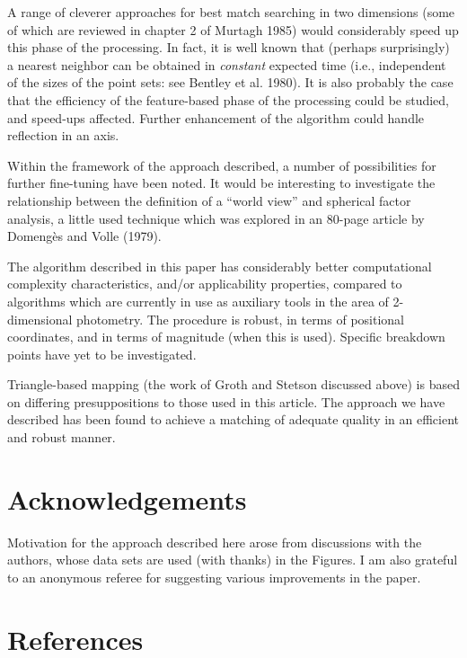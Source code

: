 A range of cleverer approaches for
best match searching in two dimensions (some of which are reviewed in chapter
2 of Murtagh 1985) would considerably speed up this phase of the processing.
In fact, it is well known that (perhaps surprisingly) a nearest neighbor 
can be obtained in {\it constant} expected time (i.e., independent of the
sizes of the point sets: see Bentley et al. 1980).
It is also probably the case that the efficiency of the 
feature-based phase of the
processing could be studied, and speed-ups affected.
 Further enhancement of the algorithm could handle 
reflection in an axis.

Within the framework of the approach described, a number of  
possibilities for further fine-tuning have been noted.  It would be
interesting to investigate the relationship between the definition
of a ``world view'' and 
spherical factor analysis, a little used technique which was
explored in an 80-page article by Domeng\`es and Volle (1979).  

The algorithm described in this paper has considerably better 
computational complexity 
characteristics, and/or applicability properties,
compared to algorithms which are currently in use as auxiliary tools in the
area of 2-dimensional photometry.   The procedure is robust, in terms of
positional coordinates, and in terms of magnitude (when this is used).  
Specific breakdown points have yet to be investigated.

Triangle-based mapping (the
work of Groth and Stetson discussed above) is based
on differing presuppositions to those used in this article.  The approach
we have described has been found to achieve a matching of adequate quality
in an efficient and robust manner.

\section*{Acknowledgements}

Motivation for the approach described here arose from discussions with the
authors, whose data sets are used (with thanks) in the Figures.  I am also
grateful to an anonymous referee for suggesting 
various improvements in the paper.

\section*{References}


